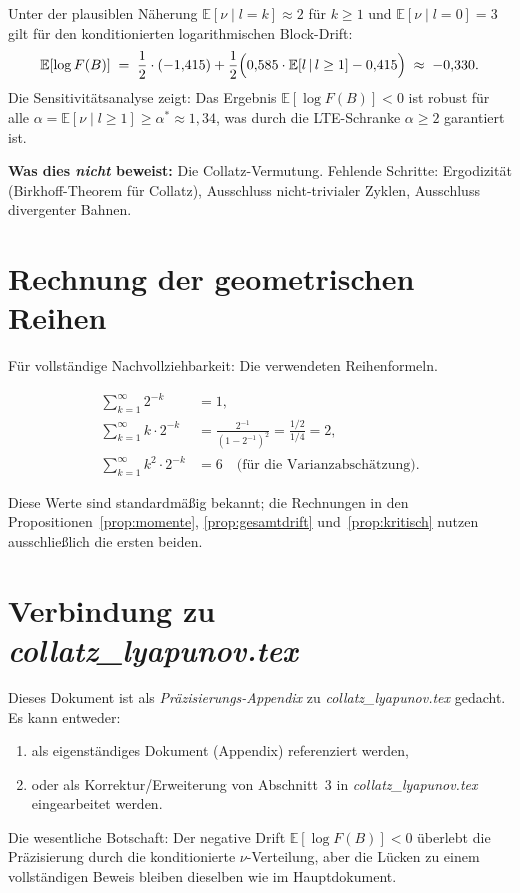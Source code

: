 \documentclass[12pt,a4paper]{article}
\newcommand{\E}{\mathbb{E}}
\newcommand{\logF}{\log F(B)}
\begin{document}
\begin{tcolorbox}[hauptsatz, title={Präzisiertes Hauptresultat (heuristisch)}]
Unter der plausiblen Näherung $\E[\nu \mid l{=}k] \approx 2$ für $k \geq 1$
und $\E[\nu \mid l{=}0] = 3$ gilt für den konditionierten logarithmischen
Block-Drift:
\[
  \E[\logF]
  \;=\; \frac{1}{2}\cdot(-1{,}415)
        + \frac{1}{2}\Bigl(0{,}585\cdot\E[l\,|\,l\geq 1] - 0{,}415\Bigr)
  \;\approx\; -0{,}330.
\]
Die Sensitivitätsanalyse zeigt: Das Ergebnis $\E[\logF] < 0$ ist robust
für alle $\alpha = \E[\nu \mid l{\geq}1] \geq \alpha^* \approx 1{,}34$,
was durch die LTE-Schranke $\alpha \geq 2$ garantiert ist.

\medskip
\textbf{Was dies \emph{nicht} beweist:}
Die Collatz-Vermutung. Fehlende Schritte: Ergodizität (Birkhoff-Theorem
für Collatz), Ausschluss nicht-trivialer Zyklen, Ausschluss divergenter
Bahnen.
\end{tcolorbox}

\appendix
\section{Rechnung der geometrischen Reihen}
\label{app:reihen}

Für vollständige Nachvollziehbarkeit: Die verwendeten Reihenformeln.

\begin{align*}
  \sum_{k=1}^{\infty} 2^{-k} &= 1, \\
  \sum_{k=1}^{\infty} k \cdot 2^{-k}
    &= \frac{2^{-1}}{(1-2^{-1})^2} = \frac{1/2}{1/4} = 2, \\
  \sum_{k=1}^{\infty} k^2 \cdot 2^{-k} &= 6
  \quad \text{(für die Varianzabschätzung).}
\end{align*}

Diese Werte sind standardmäßig bekannt; die Rechnungen in den
Propositionen~\ref{prop:momente}, \ref{prop:gesamtdrift}
und~\ref{prop:kritisch} nutzen ausschließlich die ersten beiden.

\section{Verbindung zu \textit{collatz\_lyapunov.tex}}
\label{app:verbindung}

Dieses Dokument ist als \emph{Präzisierungs-Appendix} zu
\textit{collatz\_lyapunov.tex} gedacht.
Es kann entweder:
\begin{enumerate}[noitemsep]
  \item als eigenständiges Dokument (Appendix) referenziert werden,
  \item oder als Korrektur/Erweiterung von Abschnitt~3 in
        \textit{collatz\_lyapunov.tex} eingearbeitet werden.
\end{enumerate}

Die wesentliche Botschaft: Der negative Drift $\E[\logF] < 0$
überlebt die Präzisierung durch die konditionierte $\nu$-Verteilung,
aber die Lücken zu einem vollständigen Beweis bleiben dieselben wie
im Hauptdokument.
\end{document}
